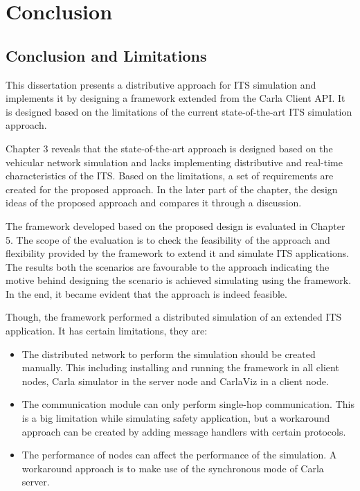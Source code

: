 \chapter{Conclusion}

\section{Conclusion and Limitations}
This dissertation presents a distributive approach for ITS simulation and implements it by designing a framework extended from the Carla Client API. It is designed based on the limitations of the current state-of-the-art ITS simulation approach. 

Chapter 3 reveals that the state-of-the-art approach is designed based on the vehicular network simulation and lacks implementing distributive and real-time characteristics of the ITS. Based on the limitations, a set of requirements are created for the proposed approach. In the later part of the chapter, the design ideas of the proposed approach and compares it through a discussion.

The framework developed based on the proposed design is evaluated in Chapter 5. The scope of the evaluation is to check the feasibility of the approach and flexibility provided by the framework to extend it and simulate ITS applications. The results both the scenarios are favourable to the approach indicating the motive behind designing the scenario is achieved simulating using the framework. In the end, it became evident that the approach is indeed feasible. 

Though, the framework performed a distributed simulation of an extended  ITS application. It has certain limitations, they are: 
\begin{itemize}
    \item The distributed network to perform the simulation should be created manually. This including installing and running the framework in all client nodes, Carla simulator in the server node and CarlaViz in a client node.
    \item The communication module can only perform single-hop communication. This is a big limitation while simulating safety application, but a workaround approach can be created by adding message handlers with certain protocols.
    \item The performance of nodes can affect the performance of the simulation. A workaround approach is to make use of the synchronous mode of Carla server.
\end{itemize}

